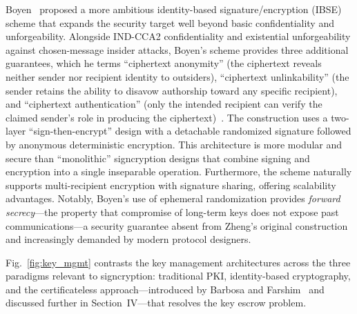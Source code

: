 \documentclass[conference]{IEEEtran}
\begin{document}
Boyen~\cite{boyen2003} proposed a more ambitious identity-based signature/encryption (IBSE) scheme that expands the security target well beyond basic confidentiality and unforgeability. Alongside IND-CCA2 confidentiality and existential unforgeability against chosen-message insider attacks, Boyen's scheme provides three additional guarantees, which he terms ``ciphertext anonymity'' (the ciphertext reveals neither sender nor recipient identity to outsiders), ``ciphertext unlinkability'' (the sender retains the ability to disavow authorship toward any specific recipient), and ``ciphertext authentication'' (only the intended recipient can verify the claimed sender's role in producing the ciphertext)~\cite{boyen2003}. The construction uses a two-layer ``sign-then-encrypt'' design with a detachable randomized signature followed by anonymous deterministic encryption. This architecture is more modular and secure than ``monolithic'' signcryption designs that combine signing and encryption into a single inseparable operation. Furthermore, the scheme naturally supports multi-recipient encryption with signature sharing, offering scalability advantages. Notably, Boyen's use of ephemeral randomization provides \textit{forward secrecy}---the property that compromise of long-term keys does not expose past communications---a security guarantee absent from Zheng's original construction and increasingly demanded by modern protocol designers.

Fig.~\ref{fig:key_mgmt} contrasts the key management architectures across the three paradigms relevant to signcryption: traditional PKI, identity-based cryptography, and the certificateless approach---introduced by Barbosa and Farshim~\cite{barbosa2008} and discussed further in Section~IV---that resolves the key escrow problem.
\end{document}
